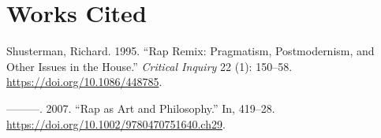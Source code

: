 \documentclass[
]{article}
\newlength{\cslhangindent}
\newlength{\cslentryspacingunit} %
\newenvironment{CSLReferences}[2] %
 {%
  \setlength{\parindent}{0pt}
  \ifodd #1
  \let\oldpar\par
  \def\par{\hangindent=\cslhangindent\oldpar}
  \fi
  \setlength{\parskip}{#2\cslentryspacingunit}
 }%
 {}
\begin{document}
\hypertarget{works-cited}{%
\section{Works Cited}\label{works-cited}}

\setlength{\parskip}{8pt}
\setlength{\parindent}{-0.15in}
\setlength{\leftskip}{0.15in}
\vspace*{-0.35in}

\noindent \singlespacing

\hypertarget{refs}{}
\begin{CSLReferences}{1}{0}
\leavevmode{}%
Shusterman, Richard. 1995. {``Rap {Remix}: {Pragmatism},
{Postmodernism}, and {Other Issues} in the {House}.''} \emph{Critical
Inquiry} 22 (1): 150--58. \url{https://doi.org/10.1086/448785}.

\leavevmode{}%
---------. 2007. {``Rap as {Art} and {Philosophy}.''} In, 419--28.
\url{https://doi.org/10.1002/9780470751640.ch29}.

\end{CSLReferences}
\end{document}
